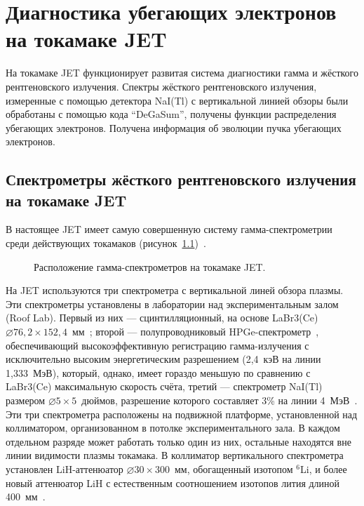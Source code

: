 \chapter{Диагностика убегающих электронов на токамаке JET}
\label{sec:asdex}

На токамаке JET функционирует развитая система диагностики гамма и жёсткого рентгеновского излучения. Спектры жёсткого рентгеновского излучения, измеренные с помощью детектора NaI(Tl) с вертикальной линией обзоры были обработаны с помощью кода ``DeGaSum'', получены функции распределения убегающих электронов. Получена информация об эволюции пучка убегающих электронов. 


\section{Спектрометры жёсткого рентгеновского излучения на токамаке JET}

В настоящее JET имеет самую совершенную систему гамма-спектрометрии среди действующих токамаков (рисунок~\ref{fig:jetHxrDetectorsScheme})~\cite{Iliasova2022}. 

\begin{figure}[ht!]
  \caption{ Расположение гамма-спектрометров на токамаке JET.~\cite{Iliasova2022} }
  \label{fig:jetHxrDetectorsScheme}
\end{figure}

На JET используются три спектрометра с вертикальной линей обзора плазмы. Эти спектрометры установлены в лаборатории над экспериментальным залом (Roof Lab). Первый из них --- сцинтилляционный, на основе LaBr3(Ce) $\varnothing 76,2 \times 152,4$~мм~\cite{Nocente2010}; второй --- полупроводниковый HPGe-спектрометр~\cite{Tardocchi2011}, обеспечивающий высокоэффективную регистрацию гамма-излучения с исключительно высоким энергетическим разрешением (2,4~кэВ на линии 1,333~МэВ), который, однако, имеет гораздо меньшую по сравнению с LaBr3(Ce) максимальную скорость счёта, третий --- спектрометр NaI(Tl) размером $\varnothing 5 \times 5$~дюймов, разрешение которого составляет 3\% на линии 4~МэВ~\cite{Tardocchi2008}. Эти три спектрометра расположены на подвижной платформе, установленной над коллиматором, организованном в потолке экспериментального зала. В каждом отдельном разряде может работать только один из них, остальные находятся вне линии видимости плазмы токамака. В коллиматор вертикального спектрометра установлен LiH-аттенюатор $\varnothing 30 \times 300$~мм, обогащенный изотопом ${}^6$Li, и более новый аттенюатор LiH с естественным соотношением изотопов лития длиной 400~мм~\cite{Murari2008}.

